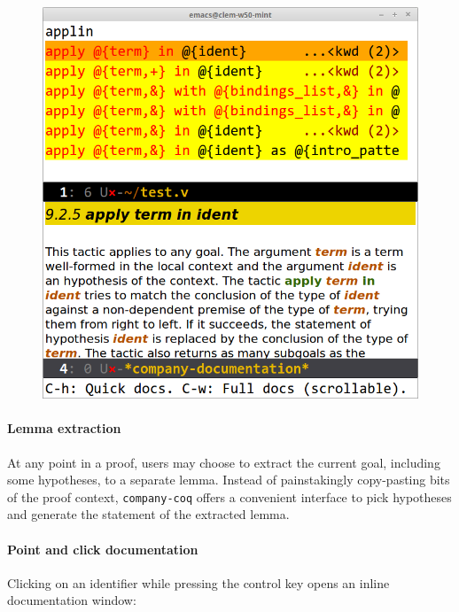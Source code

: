 \documentclass[preprint]{sigplanconf}
\begin{document}
\begin{figure}[H]
  \centering
  \includegraphics[width=\linewidth]{docs-xxl-trunc.png}
\end{figure}

\paragraph{Lemma extraction} At any point in a proof, users may choose to extract the current goal, including some hypotheses, to a separate lemma. Instead of painstakingly copy-pasting bits of the proof context, \texttt{company-coq} offers a convenient interface to pick hypotheses and generate the statement of the extracted lemma.

\paragraph{Point and click documentation} Clicking on an identifier while pressing the control key opens an inline documentation window:
\end{document}
